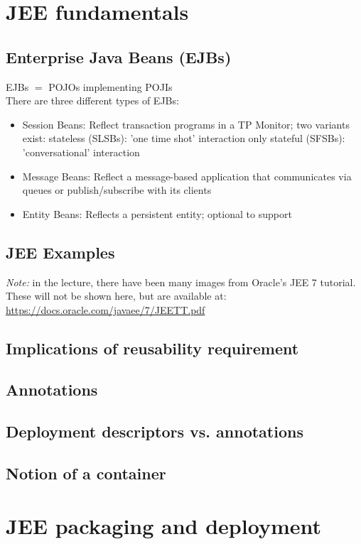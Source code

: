 	\section{JEE fundamentals}
		\subsection{Enterprise Java Beans (EJBs)}
		EJBs $ = $ POJOs implementing POJIs\\
		There are three different types of EJBs:
		\begin{itemize}
			\item Session Beans: Reflect transaction programs in a TP Monitor; two variants exist:
				\subitem stateless (SLSBs): 'one time shot' interaction only
				\subitem stateful (SFSBs): 'conversational' interaction
			\item Message Beans: Reflect a message-based application that communicates via queues or 	publish/subscribe with its clients
			\item Entity Beans: Reflects a persistent entity; optional to support
		\end{itemize}
	
		\subsection{JEE Examples}
			\textit{Note:} in the lecture, there have been many images from Oracle's JEE 7 tutorial. These will not be shown here, but are available at:  \url{https://docs.oracle.com/javaee/7/JEETT.pdf}
		
		\subsection{Implications of reusability requirement}
		
		\subsection{Annotations}
		
		\subsection{Deployment descriptors vs. annotations}
		
		\subsection{Notion of a container}
		
		\pagebreak %
		
	\section{JEE packaging and deployment}
		
		
		
	
		
		
		
		
		
		
		